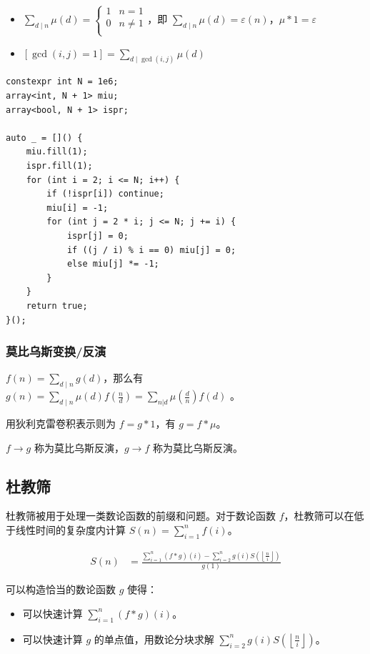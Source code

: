 \documentclass[UTF8]{ctexart}
\begin{document}
\begin{sloppypar}
\begin{itemize}
   \item $\sum_{d\mid n}\mu(d)=\begin{cases}1&n=1\\0&n\neq 1\\\end{cases}$，即 $\sum_{d\mid n}\mu(d)=\varepsilon(n)$，$\mu * 1 =\varepsilon$
   \item $\displaystyle [\gcd(i,j)=1]=\sum_{d\mid\gcd(i,j)}\mu(d)$
\end{itemize}

\begin{lstlisting}[style=cpp]
constexpr int N = 1e6;
array<int, N + 1> miu;
array<bool, N + 1> ispr;

auto _ = []() {
    miu.fill(1);
    ispr.fill(1);
    for (int i = 2; i <= N; i++) {
        if (!ispr[i]) continue;
        miu[i] = -1;
        for (int j = 2 * i; j <= N; j += i) {
            ispr[j] = 0;
            if ((j / i) % i == 0) miu[j] = 0;
            else miu[j] *= -1;
        }
    }
    return true;
}();
\end{lstlisting}

\subsubsection{莫比乌斯变换/反演}

$f(n)=\sum_{d\mid n}g(d)$，那么有 $g(n)=\sum_{d\mid n}\mu(d)f(\frac{n}{d})=\sum_{n|d}\mu(\frac{d}{n})f(d)$
。

用狄利克雷卷积表示则为 $f=g\ast1$，有 $g=f\ast\mu$。

$f \rightarrow g$ 称为莫比乌斯反演，$g \rightarrow f$ 称为莫比乌斯反演。

\subsection{杜教筛}

杜教筛被用于处理一类数论函数的前缀和问题。对于数论函数 $f$，杜教筛可以在低于线性时间的复杂度内计算 $S(n)=\sum_{i=1}^{n}f(i)$。

$$
\begin{aligned}
    S(n) & = \frac{\sum_{i=1}^n (f * g)(i) - \sum_{i=2}^n g(i)S\left(\left\lfloor\frac{n}{i}\right\rfloor\right)}{g(1)}
\end{aligned}
$$

可以构造恰当的数论函数 $g$ 使得：

\begin{itemize}
   \item 可以快速计算 $\sum_{i=1}^n(f * g)(i)$。
   \item 可以快速计算 $g$ 的单点值，用数论分块求解 $\sum_{i=2}^ng(i)S\left(\left\lfloor\frac{n}{i}\right\rfloor\right)$。
\end{itemize}


\end{sloppypar}
\end{document}
